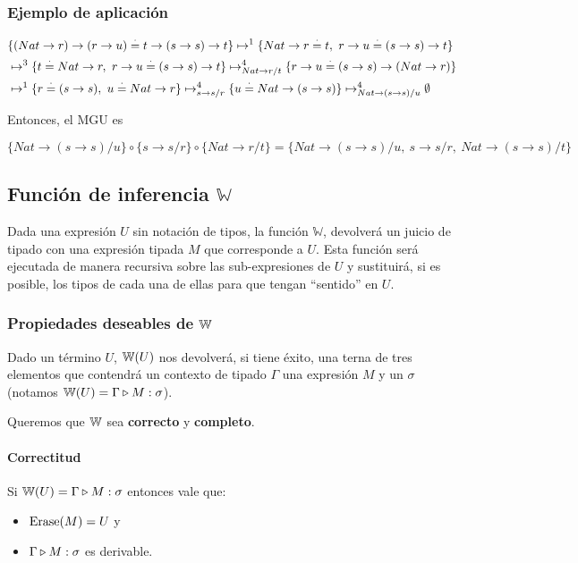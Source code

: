 \subsubsection{Ejemplo de aplicación}
\begin{equation*}
	\begin{split}
		&\{(Nat\to r)\to(r\to u) \overset{\cdot}{=} t\to(s\to s)\to t\}
		\mapsto^1 \{Nat\to r\overset{\cdot}{=} t,~r\to u\overset{\cdot}{=} (s\to s)\to t\} \\
		&\mapsto^3 \{t\overset{\cdot}{=} Nat\to r,~r\to u\overset{\cdot}{=} (s\to s)\to t\} 
		\mapsto^4_{Nat\to r/t} \{r\to u\overset{\cdot}{=} (s\to s)\to (Nat\to r)\} \\
		&\mapsto^1 \{r\overset{\cdot}{=}(s\to s),~u\overset{\cdot}{=} Nat\to r\} 
		\mapsto^4_{s\to s/r} \{u\overset{\cdot}{=} Nat\to (s\to s)\}
		\mapsto^4_{Nat\to(s\to s)/u} \emptyset \\
	\end{split}
\end{equation*}

Entonces, el MGU es 

$\{Nat\to(s\to s)/u\}\circ\{s\to s/r\}\circ\{Nat\to r/t\} = \{Nat\to(s\to s)/u,~s\to s/r,~Nat\to (s\to s)/t\}$

\subsection{Función de inferencia \texorpdfstring{$\mathbb{W}$}{W}}
Dada una expresión $U$ sin notación de tipos, la función $\mathbb{W}$, devolverá un juicio de tipado con una expresión tipada $M$ que corresponde a $U$. Esta función será ejecutada de manera recursiva sobre las sub-expresiones de $U$ y sustituirá, si es posible, los tipos de cada una de ellas para que tengan ``sentido'' en $U$.




\subsubsection{Propiedades deseables de \texorpdfstring{$\mathbb{W}$}{W}}
Dado un término $U$, $\mathbb{W}(U)$ nos devolverá, si tiene éxito, una terna de tres elementos que contendrá un contexto de tipado $\Gamma$ una expresión $M$ y un $\sigma$ (notamos $\mathbb{W}(U) = \Gamma\triangleright M : \sigma$).

Queremos que $\mathbb{W}$ sea \textbf{correcto} y \textbf{completo}.

\paragraph{Correctitud} Si $\mathbb{W}(U) = \Gamma\triangleright M : \sigma$ entonces vale que:
\begin{itemize}
	\item $\operatorname{Erase}(M) = U$ y
	\item $\Gamma\triangleright M : \sigma$ es derivable.
\end{itemize}

